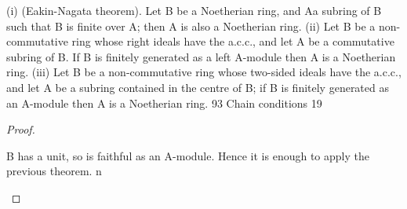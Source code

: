 \begin{theorem}[Theorem 3.7]\label{mcrt-auto-theorem-3-7}\uses{}
\begin{mathematicalrecord}
(i) (Eakin-Nagata    theorem). Let B be a Noetherian ring, and Aa subring
of B such that B is finite over A; then A is also a Noetherian ring.
    (ii) Let B be a non-commutative    ring whose right ideals have the a.c.c.,
and let A be a commutative subring of B. If B is finitely generated as a
left A-module then A is a Noetherian ring.
    (iii) Let B be a non-commutative     ring whose two-sided ideals have the
a.c.c., and let A be a subring contained in the centre of B; if B is finitely
generated as an A-module then A is a Noetherian ring.
93        Chain conditions                                                          19
\end{mathematicalrecord}
\end{theorem}
\begin{proof}
\begin{mathematicalrecord}
B has a unit, so is faithful as an A-module.              Hence it is enough to
apply the previous theorem.      n
\end{mathematicalrecord}
\end{proof}
